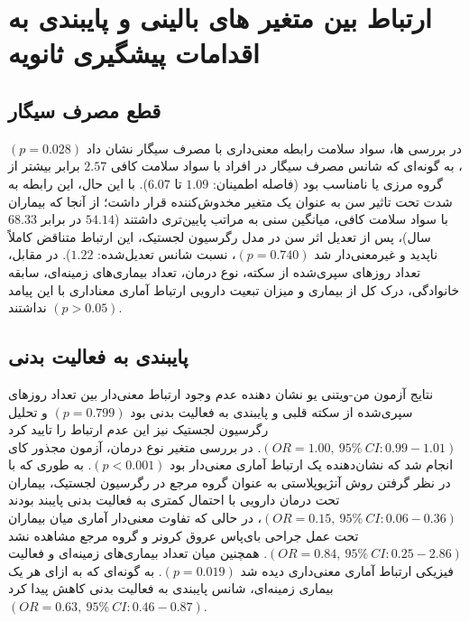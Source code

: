 \section{ارتباط بین متغیر های بالینی و پایبندی به اقدامات پیشگیری ثانویه}

\subsection*{\textbf{قطع مصرف سیگار}}


در بررسی ها، سواد سلامت رابطه معنی‌داری با مصرف سیگار نشان داد $(p=0.028)$، به گونه‌ای که شانس مصرف سیگار در افراد با سواد سلامت کافی $2.57$ برابر بیشتر از گروه مرزی یا نامناسب بود (فاصله اطمینان: $1.09$ تا $6.07$). با این حال، این رابطه به شدت تحت تاثیر سن به عنوان یک متغیر مخدوش‌کننده قرار داشت؛ از آنجا که بیماران با سواد سلامت کافی، میانگین سنی به مراتب پایین‌تری داشتند ($54.14$ در برابر $68.33$سال)، پس از تعدیل اثر سن در مدل رگرسیون لجستیک، این ارتباط متناقض کاملاً ناپدید و غیرمعنی‌دار شد $(p=0.740)$، نسبت شانس تعدیل‌شده: $1.22$). در مقابل، تعداد روزهای سپری‌شده از سکته، نوع درمان، تعداد بیماری‌های زمینه‌ای، سابقه خانوادگی، درک کل از بیماری و میزان تبعیت دارویی ارتباط آماری معناداری با این پیامد نداشتند $(p>0.05)$.



\subsection*{\textbf{پایبندی به فعالیت بدنی}}


نتایج آزمون من-ویتنی یو نشان دهنده عدم وجود ارتباط معنی‌دار بین تعداد روزهای سپری‌شده از سکته قلبی و پایبندی به فعالیت بدنی بود $(p=0.799)$ و تحلیل رگرسیون لجستیک نیز این عدم ارتباط را تایید کرد 
$(OR=1.00, \ 95\% \ CI:0.99-1.01)$. در بررسی متغیر نوع درمان، آزمون مجذور کای انجام شد که نشان‌دهنده یک ارتباط آماری معنی‌دار بود $(p<0.001)$. به طوری که با در نظر گرفتن روش آنژیوپلاستی به عنوان گروه مرجع در رگرسیون لجستیک، بیماران تحت درمان دارویی با احتمال کمتری به فعالیت بدنی پایبند بودند $(OR=0.15, \ 95\% \ CI:0.06-0.36)$، در حالی که تفاوت معنی‌دار آماری میان بیماران تحت عمل جراحی بای‌پاس عروق کرونر و گروه مرجع مشاهده نشد $(OR=0.84, \ 95\% \ CI:0.25-2.86)$. همچنین میان تعداد بیماری‌های زمینه‌ای و فعالیت فیزیکی ارتباط آماری معنی‌داری دیده شد $(p=0.019)$. به گونه‌ای که به ازای هر یک بیماری زمینه‌ای، شانس پایبندی به فعالیت بدنی کاهش پیدا کرد $(OR=0.63, \ 95\% \ CI:0.46-0.87)$.


